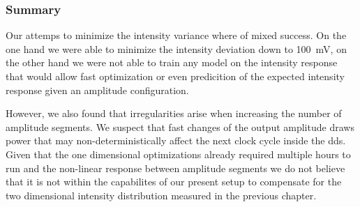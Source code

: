 \subsubsection{Summary}

Our attemps to minimize the intensity variance where of mixed success. On
the one hand we were able to minimize the intensity deviation down
to \SI{100}{\milli\volt}, on the other hand we were not able to train any
model on the intensity response that would allow fast optimization or even
predicition of the expected intensity response given an amplitude
configuration.

However, we also found that irregularities arise when increasing the
number of amplitude segments. We suspect that fast changes of the output
amplitude draws power that may non-deterministically affect the next clock
cycle inside the \gls{dds}. Given that the one dimensional optimizations
already required multiple hours to run and the non-linear response between
amplitude segments we do not believe that it is not within the capabilites of
our present setup to compensate for the two dimensional intensity distribution
measured in the previous chapter.
